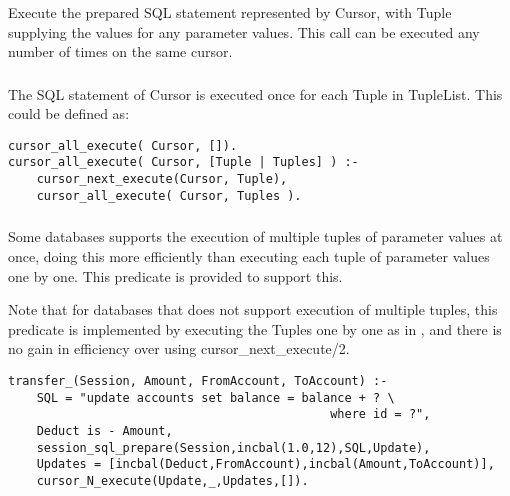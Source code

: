 \subsubsection{}
\label{cursor-next-execute/2}

Execute the prepared SQL statement represented by Cursor, with Tuple
supplying the values for any parameter values.
This call can be executed any number of times on the same cursor.

\subsubsection
{}
\label{cursor-all-execute/2}

The SQL statement of Cursor is executed once for each Tuple in 
TupleList. This could be defined as:
\begin{verbatim}
cursor_all_execute( Cursor, []).
cursor_all_execute( Cursor, [Tuple | Tuples] ) :-
    cursor_next_execute(Cursor, Tuple),
    cursor_all_execute( Cursor, Tuples ).
\end{verbatim}

\subsubsection
{}
\label{cursor-N-execute/4}

Some databases supports the execution of multiple tuples of parameter values at
once, doing this more efficiently than executing each tuple of parameter
values one by one. This predicate is provided to support this. 

Note that for databases that does not support execution of multiple tuples, this
predicate is implemented by executing the Tuples one by one as in 
,
and there is no gain in efficiency over using cursor_next_execute/2.

\begin{verbatim}
transfer_(Session, Amount, FromAccount, ToAccount) :-
    SQL = "update accounts set balance = balance + ? \
                                             where id = ?",
    Deduct is - Amount,
    session_sql_prepare(Session,incbal(1.0,12),SQL,Update),
    Updates = [incbal(Deduct,FromAccount),incbal(Amount,ToAccount)],
    cursor_N_execute(Update,_,Updates,[]).
\end{verbatim}

